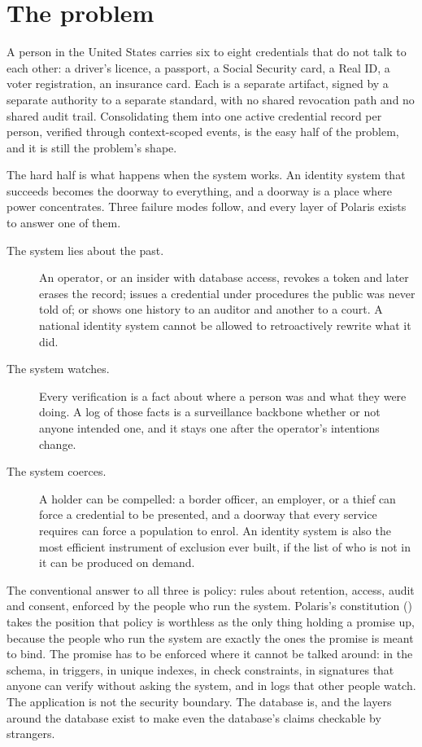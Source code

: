 \section{The problem}
\label{sec:problem}

A person in the United States carries six to eight credentials that do not talk to each other:
a driver's licence, a passport, a Social Security card, a Real ID, a voter registration, an
insurance card. Each is a separate artifact, signed by a separate authority to a separate standard,
with no shared revocation path and no shared audit trail. Consolidating them into one active
credential record per person, verified through context-scoped events, is the easy half of the
problem, and it is still the problem's shape.

The hard half is what happens when the system works. An identity system that succeeds becomes the
doorway to everything, and a doorway is a place where power concentrates. Three failure modes
follow, and every layer of Polaris exists to answer one of them.

\begin{description}
  \item[The system lies about the past.] An operator, or an insider with database access,
    revokes a token and later erases the record; issues a credential under procedures the public
    was never told of; or shows one history to an auditor and another to a court. A national
    identity system cannot be allowed to retroactively rewrite what it did.
  \item[The system watches.] Every verification is a fact about where a person was and what they
    were doing. A log of those facts is a surveillance backbone whether or not anyone intended one,
    and it stays one after the operator's intentions change.
  \item[The system coerces.] A holder can be compelled: a border officer, an employer, or a
    thief can force a credential to be presented, and a doorway that every service requires can
    force a population to enrol. An identity system is also the most efficient instrument of
    exclusion ever built, if the list of who is not in it can be produced on demand.
\end{description}

The conventional answer to all three is policy: rules about retention, access, audit and consent,
enforced by the people who run the system. Polaris's constitution () takes the
position that policy is worthless as the only thing holding a promise up, because the people who
run the system are exactly the ones the promise is meant to bind. The promise has to be enforced
where it cannot be talked around: in the schema, in triggers, in unique indexes, in check
constraints, in signatures that anyone can verify without asking the system, and in logs that other
people watch. The application is not the security boundary. The database is, and the layers around
the database exist to make even the database's claims checkable by strangers.

